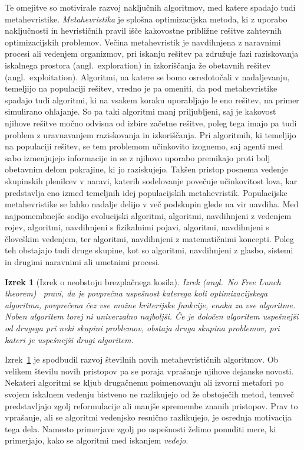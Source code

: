 \documentclass[a4paper, 12pt]{book}
\newtheorem{izrek}{Izrek}[chapter]
\begin{document}
Te omejitve so motivirale razvoj naključnih algoritmov, med katere spadajo tudi metahevristike. \emph{Metahevristika} je splošna optimizacijska metoda, ki z uporabo naključnosti in hevrističnih pravil išče kakovostne približne rešitve zahtevnih optimizacijskih problemov. Večina metahevristik je na\-vdih\-nje\-na z naravnimi procesi ali vedenjem organizmov, pri iskanju rešitev pa združuje fazi raziskovanja iskalnega prostora (angl.\ exploration) in izkoriščanja že obetavnih rešitev (angl.\ exploitation).
Algoritmi, na katere se bomo osredotočali v nadaljevanju, temeljijo na populaciji rešitev, vredno je pa omeniti, da pod metahevristike spadajo tudi algoritmi, ki na vsakem koraku uporabljajo le eno rešitev, na primer simulirano ohlajanje. So pa taki algoritmi manj priljubljeni, saj je kakovost njihove rešitve močno odvisna od izbire začetne rešitve, poleg tega imajo pa tudi problem z uravnavanjem raziskovanja in izkoriščanja. Pri algoritmih, ki temeljijo na populaciji rešitev, se tem problemom učinkovito izognemo, saj agenti med sabo izmenjujejo informacije in se z njihovo uporabo premikajo proti bolj obetavnim delom pokrajine, ki jo raziskujejo. 
Takšen pristop posnema vedenje skupinskih plenilcev v naravi, katerih sodelovanje povečuje učinkovitost lova, kar predstavlja eno izmed temeljnih idej populacijskih metahevristik. Populacijske metahevristike se lahko nadalje delijo v več podskupin glede na vir navdiha. Med najpomembnejše sodijo evolucijski algoritmi, algoritmi, navdihnjeni z vedenjem rojev, algoritmi, navdihnjeni s fizikalnimi pojavi, algoritmi, na\-vdih\-nje\-ni s človeškim vedenjem, ter algoritmi, navdihnjeni z matematičnimi koncepti. Poleg teh obstajajo tudi druge skupine, kot so algoritmi, navdihnjeni z glasbo, sistemi in drugimi naravnimi ali umetnimi procesi.

\begin{izrek}[Izrek o neobstoju brezplačnega kosila]
    Izrek (angl.\ No Free Lunch theorem)~\cite{585893}
    pravi, da je povprečna uspešnost katerega koli optimizacijskega algoritma,
    povprečena čez vse možne kriterijske funkcije, enaka za vse algoritme.
    Noben algoritem torej ni univerzalno najboljši. Če je določen algoritem
    uspešnejši od drugega pri neki skupini problemov, obstaja druga skupina
    problemov, pri kateri je uspešnejši drugi algoritem.
    \label{izrek:NFL}
\end{izrek}

Izrek~\ref{izrek:NFL} je spodbudil razvoj številnih novih metahevrističnih
algoritmov. Ob velikem številu novih pristopov pa se poraja vprašanje njihove
dejanske novosti. Nekateri algoritmi se kljub drugačnemu poimenovanju ali
izvorni metafori po svojem iskalnem vedenju bistveno ne razlikujejo od že
obstoječih metod, temveč predstavljajo zgolj reformulacije ali manjše
spremembe znanih pristopov. Prav to vprašanje, ali se algoritmi vedenjsko
resnično razlikujejo, je osrednja motivacija tega dela. Namesto
primerjave zgolj po uspešnosti želimo ponuditi mere, ki primerjajo, kako
se algoritmi med iskanjem \emph{vedejo}.
\end{document}
